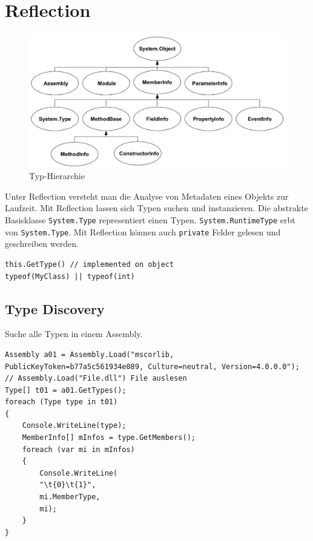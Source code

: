 \documentclass[
a4paper,
oneside,
10pt,
fleqn,
headsepline,
toc=listofnumbered, 
bibliography=totocnumbered]{scrartcl}
\let\stdsection\section
\renewcommand\section{\clearpage\stdsection}
\begin{document}
\section{Reflection}

\begin{figure}[h!]
\centering
\includegraphics[width=0.8\linewidth]{images/member_hierarchie}
\caption{Typ-Hierarchie}
\label{fig:valuetypes}
\end{figure}

Unter Reflection versteht man die Analyse von Metadaten eines Objekts zur Laufzeit. Mit Reflection lassen sich Typen suchen und instanzieren. Die abstrakte Basisklasse \lstinline|System.Type| representiert einen Typen. \lstinline|System.RuntimeType| erbt von \lstinline|System.Type|. Mit Reflection können auch \lstinline|private| Felder gelesen und geschreiben werden.

\begin{lstlisting}[caption=Reflection]
this.GetType() // implemented on object
typeof(MyClass) || typeof(int)
\end{lstlisting}

\subsection{Type Discovery}
Suche alle Typen in einem Assembly.
\begin{lstlisting}[caption=Reflection: Type Discovery]
Assembly a01 = Assembly.Load("mscorlib, PublicKeyToken=b77a5c561934e089, Culture=neutral, Version=4.0.0.0");
// Assembly.Load("File.dll") File auslesen
Type[] t01 = a01.GetTypes();
foreach (Type type in t01)
{
	Console.WriteLine(type);
	MemberInfo[] mInfos = type.GetMembers();
	foreach (var mi in mInfos)
	{
		Console.WriteLine(
		"\t{0}\t{1}",
		mi.MemberType,
		mi);
	}
}
\end{lstlisting}
\end{document}
